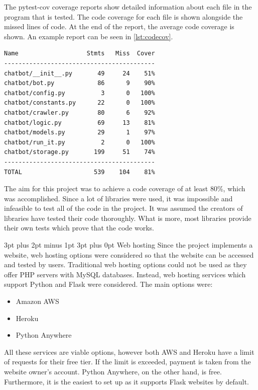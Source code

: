 \documentclass[12pt,a4paper]{article}
\makeatletter
\renewcommand\subsection{\@startsection {subsection}{1}{2mm} %
                                        {3pt plus 2pt minus 1pt} %
                                        {3pt plus 0pt} %
                                        {\normalfont\bfseries}}
\newcommand{\captionstyle}[1] {
    \small{#1}
}
\makeatother
\begin{document}
The pytest-cov coverage reports show detailed information about each file in the program that is tested. The code coverage for each file is shown alongside the missed lines of code. At the end of the report, the average code coverage is shown. An example report can be seen in \cref{lst:codecov}.

\begin{lstlisting}[caption={\captionstyle{A code coverage report produced with pytest-cov.}}, label={lst:codecov}]
Name                   Stmts   Miss  Cover
------------------------------------------
chatbot/__init__.py       49     24    51%
chatbot/bot.py            86      9    90%
chatbot/config.py          3      0   100%
chatbot/constants.py      22      0   100%
chatbot/crawler.py        80      6    92%
chatbot/logic.py          69     13    81%
chatbot/models.py         29      1    97%
chatbot/run_it.py          2      0   100%
chatbot/storage.py       199     51    74%
------------------------------------------
TOTAL                    539    104    81%    
\end{lstlisting}

The aim for this project was to achieve a code coverage of at least 80\%, which was accomplished. Since a lot of libraries were used, it was impossible and infeasible to test all of the code in the project. It was assumed the creators of libraries have tested their code thoroughly. What is more, most libraries provide their own tests which prove that the code works.

\subsection{Web hosting}
Since the project implements a website, web hosting options were considered so that the website can be accessed and tested by users. Traditional web hosting options could not be used as they offer PHP servers with MySQL databases. Instead, web hosting services which support Python and Flask were considered. The main options were:
\begin{itemize}
	\item Amazon AWS 
    \item Heroku
	\item Python Anywhere
\end{itemize}

All these services are viable options, however both AWS and Heroku have a limit of requests for their free tier. If the limit is exceeded, payment is taken from the website owner’s account. Python Anywhere, on the other hand, is free. Furthermore, it is the easiest to set up as it supports Flask websites by default.
\end{document}
